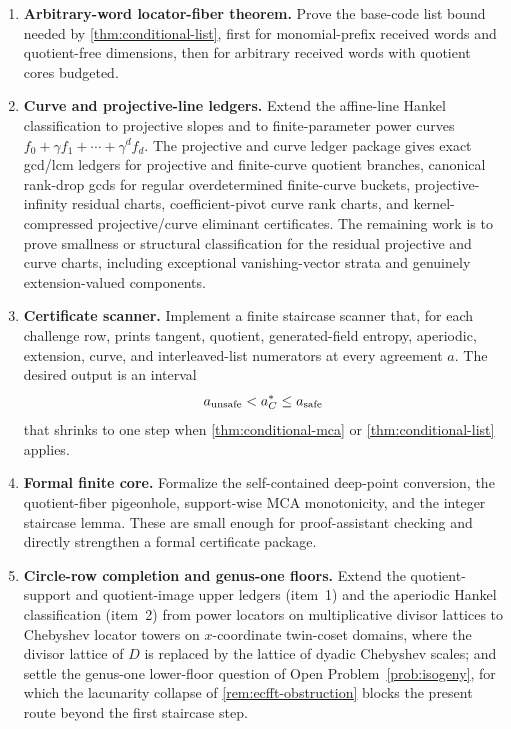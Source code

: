 \documentclass[11pt]{article}
\theoremstyle{definition}
\theoremstyle{remark}
\begin{document}
\begin{enumerate}[label=\textbf{T\arabic*.},leftmargin=2.5em]
\item \textbf{Arbitrary-word locator-fiber theorem.}  Prove the base-code list
bound needed by \cref{thm:conditional-list}, first for monomial-prefix received
words and quotient-free dimensions, then for arbitrary received words with
quotient cores budgeted.

\item \textbf{Curve and projective-line ledgers.}  Extend the affine-line Hankel
classification to projective slopes and to finite-parameter power curves
$f_0+\gamma f_1+\cdots+\gamma^d f_d$.  The projective and curve ledger package gives exact gcd/lcm ledgers
for projective and finite-curve quotient branches, canonical rank-drop gcds for
regular overdetermined finite-curve buckets, projective-infinity residual charts,
coefficient-pivot curve rank charts, and kernel-compressed projective/curve
eliminant certificates.  The remaining work is to prove smallness or structural
classification for the residual projective and curve charts, including
exceptional vanishing-vector strata and genuinely extension-valued components.

\item \textbf{Certificate scanner.}  Implement a finite staircase scanner that,
for each challenge row, prints tangent, quotient, generated-field entropy,
aperiodic, extension, curve, and interleaved-list numerators at every agreement
$a$.  The desired output is an interval
\[
        a_{\rm unsafe}<a_C^*\le a_{\rm safe}
\]
that shrinks to one step when \cref{thm:conditional-mca} or
\cref{thm:conditional-list} applies.

\item \textbf{Formal finite core.}  Formalize the self-contained deep-point
conversion, the quotient-fiber pigeonhole, support-wise MCA monotonicity, and
the integer staircase lemma.  These are small enough for proof-assistant
checking and directly strengthen a formal certificate package.

\item \textbf{Circle-row completion and genus-one floors.}  Extend the
quotient-support and quotient-image upper ledgers (item~1) and the aperiodic
Hankel classification (item~2) from power locators on multiplicative divisor
lattices to Chebyshev locator towers on $x$-coordinate twin-coset domains,
where the divisor lattice of $D$ is replaced by the lattice of dyadic
Chebyshev scales; and settle the genus-one lower-floor question of
Open Problem~\ref{prob:isogeny}, for which the lacunarity collapse of
\cref{rem:ecfft-obstruction} blocks the present route beyond the first
staircase step.
\end{enumerate}
\end{document}
